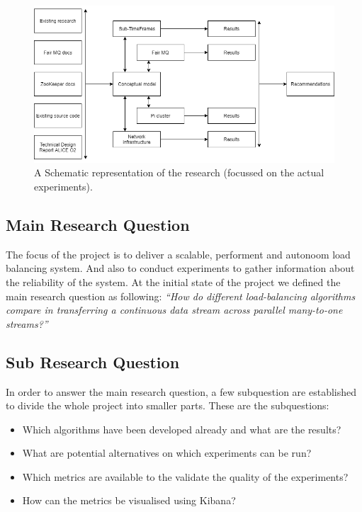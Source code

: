 \documentclass[]{article}
\begin{document}
\begin{center}
	\begin{figure}[H]
		\includegraphics[width=\textwidth]{images/research-model}
		\caption{A Schematic representation of the research (focussed on the actual experiments).}
		\label{fig:ssh}
	\end{figure}
\end{center}

\subsection{Main Research Question} 
The focus of the project is to deliver a scalable, performent and autonoom load balancing system. And also to conduct experiments to gather information about the reliability of the system.
At the initial state of the project we defined the main research question as following: \textit{“How do different load-balancing algorithms compare in transferring a continuous data stream across parallel many-to-one streams?”}

\subsection{Sub Research Question}
In order to answer the main research question, a few subquestion are established to divide the whole project into smaller parts. These are the subquestions:
\begin{itemize}
	\itemsep 0em
	\item Which algorithms have been developed already and what are the results?
	\item What are potential alternatives on which experiments can be run?
	\item Which metrics are available to the validate the quality of the experiments?
	\item How can the metrics be visualised using Kibana?
\end{itemize}
\end{document}
